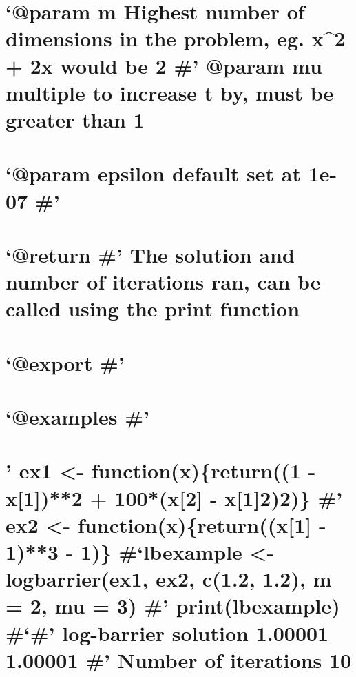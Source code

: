 \documentclass[]{article}
\begin{document}
{{\section{\texorpdfstring{`@param m Highest number of dimensions in the
problem, eg. x\^{}2 + 2x would be 2 \#' @param mu multiple to increase t
by, must be greater than
1}{@param m Highest number of dimensions in the problem, eg. x\^{}2 + 2x would be 2 \# @param mu multiple to increase t by, must be greater than 1}}\label{param-m-highest-number-of-dimensions-in-the-problem-eg.-x2-2x-would-be-2-param-mu-multiple-to-increase-t-by-must-be-greater-than-1}

\section{\texorpdfstring{`@param epsilon default set at 1e-07
\#'}{@param epsilon default set at 1e-07 \#}}\label{param-epsilon-default-set-at-1e-07}

\section{\texorpdfstring{`@return \#' The solution and number of
iterations ran, can be called using the print
function}{@return \# The solution and number of iterations ran, can be called using the print function}}\label{return-the-solution-and-number-of-iterations-ran-can-be-called-using-the-print-function}

\section{\texorpdfstring{`@export \#'}{@export \#}}\label{export}

\section{\texorpdfstring{`@examples \#'}{@examples \#}}\label{examples}

\section{\texorpdfstring{' ex1 \textless{}- function(x)\{return((1 -
x{[}1{]})**2 + 100*(x{[}2{]} - x{[}1{]}\textbf{2)}2)\} \#' ex2
\textless{}- function(x)\{return((x{[}1{]} - 1)**3 - 1)\} \#`lbexample
\textless{}-logbarrier(ex1, ex2, c(1.2, 1.2), m = 2, mu = 3) \#'
print(lbexample) \#`\#' log-barrier solution 1.00001 1.00001 \#' Number
of iterations
10}{' ex1 \textless{}- function(x)\{return((1 - x{[}1{]})**2 + 100*(x{[}2{]} - x{[}1{]}2)2)\} \#' ex2 \textless{}- function(x)\{return((x{[}1{]} - 1)**3 - 1)\} \#lbexample \textless{}-logbarrier(ex1, ex2, c(1.2, 1.2), m = 2, mu = 3) \# print(lbexample) \#\# log-barrier solution 1.00001 1.00001 \#' Number of iterations 10}}\label{ex1---functionxreturn1---x12-100x2---x122-ex2---functionxreturnx1---13---1-lbexample--logbarrierex1-ex2-c1.2-1.2-m-2-mu-3-printlbexample-log-barrier-solution-1.00001-1.00001-number-of-iterations-10}

}}
\end{document}
